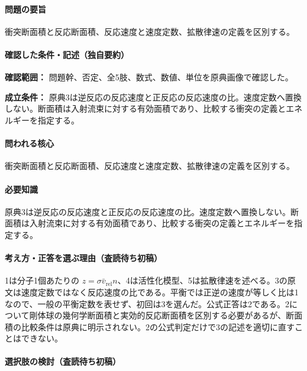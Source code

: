 \paragraph{問題の要旨} 衝突断面積と反応断面積、反応速度と速度定数、拡散律速の定義を区別する。

\paragraph{確認した条件・記述（独自要約）}\mbox{}\par

\noindent\textbf{確認範囲：} 問題幹、否定、全5肢、数式、数値、単位を原典画像で確認した。\par

\noindent\textbf{成立条件：} 原典3は逆反応の反応速度と正反応の反応速度の比。速度定数へ置換しない。断面積は入射流束に対する有効面積であり、比較する衝突の定義とエネルギーを指定する。\par

\paragraph{問われる核心} 衝突断面積と反応断面積、反応速度と速度定数、拡散律速の定義を区別する。

\paragraph{必要知識} 原典3は逆反応の反応速度と正反応の反応速度の比。速度定数へ置換しない。断面積は入射流束に対する有効面積であり、比較する衝突の定義とエネルギーを指定する。

\paragraph{考え方・正答を選ぶ理由（査読待ち初稿）} 1は分子1個あたりの \(z=\sigma\bar v_{\mathrm{rel}}n\)、4は活性化模型、5は拡散律速を述べる。3の原文は速度定数ではなく反応速度の比である。平衡では正逆の速度が等しく比は1なので、一般の平衡定数を表せず、初回は3を選んだ。公式正答は2である。2について剛体球の幾何学断面積と実効的反応断面積を区別する必要があるが、断面積の比較条件は原典に明示されない。2の公式判定だけで3の記述を適切に直すことはできない。

\paragraph{選択肢の検討（査読待ち初稿）}\mbox{}\par

